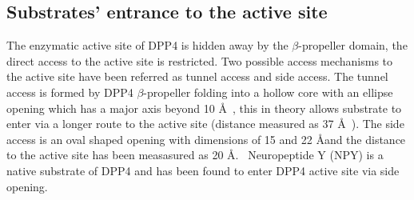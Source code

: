 \subsection{Substrates' entrance to the active site}

The enzymatic active site of DPP4 is hidden away by the $\beta$-propeller domain, the direct access to the active site is restricted. Two possible access mechanisms to the active site have been referred as tunnel access and side access. The tunnel access is formed by DPP4 $\beta$-propeller  folding into a hollow core with an ellipse opening which has a major axis beyond 10 \AA~\cite{Hiramatsu2003}, this in theory allows substrate to enter via a longer route to the active site (distance measured as 37 \AA~\cite{Engel_2003}). The side access is an oval shaped opening with dimensions of 15 and 22 \AA and the distance to the active site has been measasured as 20 \AA.~\cite{Engel_2003, Rasmussen_2002,Weihofen_2004} Neuropeptide Y (NPY) is a native substrate of DPP4 and has been found to enter DPP4 active site via side opening. ~\cite{Aertgeerts_2004}
